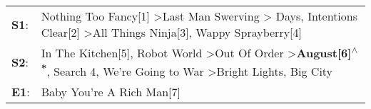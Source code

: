 \begin{supertabular}{p{0.03\textwidth}p{0.92\textwidth}}
 \textbf{S1}:  &                                              Nothing Too Fancy[1]\textsuperscript{} \textgreater \enspace Last Man Swerving\textsuperscript{} \textgreater {} Days\textsuperscript{}, \enspace Intentions Clear[2]\textsuperscript{} \textgreater \enspace All Things Ninja[3]\textsuperscript{}, \enspace Wappy Sprayberry[4]\textsuperscript{}  \enspace  \\
 \textbf{S2}:  &  In The Kitchen[5]\textsuperscript{}, \enspace Robot World\textsuperscript{} \textgreater \enspace Out Of Order\textsuperscript{} \textgreater \enspace \textbf{August[6]\textsuperscript{$\wedge$*}}, \enspace Search 4\textsuperscript{}, \enspace We're Going to War\textsuperscript{} \textgreater \enspace Bright Lights, Big City\textsuperscript{}  \enspace  \\
 \textbf{E1}:  &                                                                                                                                                                                                                                                                                                               Baby You're A Rich Man[7]\textsuperscript{}  \enspace  \\
\end{supertabular}
